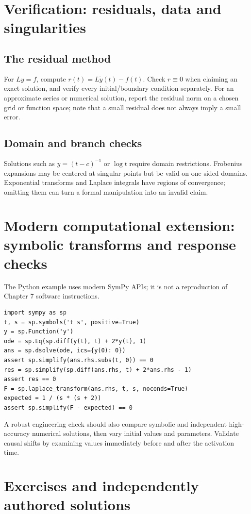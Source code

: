 \documentclass[11pt,letterpaper,oneside]{report}
\theoremstyle{definition}\newtheorem{definition}[theorem]{Definition}
\theoremstyle{remark}\newtheorem{remark}[theorem]{Remark}
\begin{document}
\chapter{Verification: residuals, data and singularities}
\section{The residual method}
For $Ly=f$, compute $r(t)=L\tilde y(t)-f(t)$. Check $r\equiv0$ when claiming an exact solution, and verify every initial/boundary condition separately. For an approximate series or numerical solution, report the residual norm on a chosen grid or function space; note that a small residual does not always imply a small error.
\section{Domain and branch checks}
Solutions such as $y=(t-c)^{-1}$ or $\log t$ require domain restrictions. Frobenius expansions may be centered at singular points but be valid on one-sided domains. Exponential transforms and Laplace integrals have regions of convergence; omitting them can turn a formal manipulation into an invalid claim.
\chapter{Modern computational extension: symbolic transforms and response checks}
\begin{modern}The Python example uses modern SymPy APIs; it is not a reproduction of Chapter 7 software instructions.\end{modern}
\begin{lstlisting}
import sympy as sp
t, s = sp.symbols('t s', positive=True)
y = sp.Function('y')
ode = sp.Eq(sp.diff(y(t), t) + 2*y(t), 1)
ans = sp.dsolve(ode, ics={y(0): 0})
assert sp.simplify(ans.rhs.subs(t, 0)) == 0
res = sp.simplify(sp.diff(ans.rhs, t) + 2*ans.rhs - 1)
assert res == 0
F = sp.laplace_transform(ans.rhs, t, s, noconds=True)
expected = 1 / (s * (s + 2))
assert sp.simplify(F - expected) == 0
\end{lstlisting}
A robust engineering check should also compare symbolic and independent high-accuracy numerical solutions, then vary initial values and parameters. Validate causal shifts by examining values immediately before and after the activation time.
\chapter{Exercises and independently authored solutions}
\end{document}
